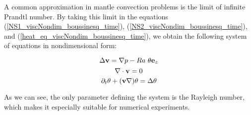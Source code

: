 A common approximation in mantle convection problems is the limit of infinite Prandtl number. By taking this limit in the equations (\ref{NS1_viscNondim_boussinesq_time}), (\ref{NS2_viscNondim_boussinesq_time}), and (\ref{heat_eq_viscNondim_boussinesq_time}), we obtain the following system of equations in nondimensional form:

\begin{equation} \label{NS1_viscNondim_boussinesq_prandtl}
\Delta\mathbf{v} = \nabla p - Ra ~\theta \mathbf{e}_z
\end{equation}
\begin{equation} \label{NS2_viscNondim_boussinesq_prandtl}
\nabla\cdot \mathbf{v} = 0
\end{equation}
\begin{equation} \label{heat_eq_viscNondim_boussinesq_prandtl}
\partial_t\theta + (\mathbf{v}\nabla)\theta = \Delta\theta  
\end{equation} 

As we can see, the only parameter defining the system is the Rayleigh number, which makes it especially suitable for numerical experiments.
